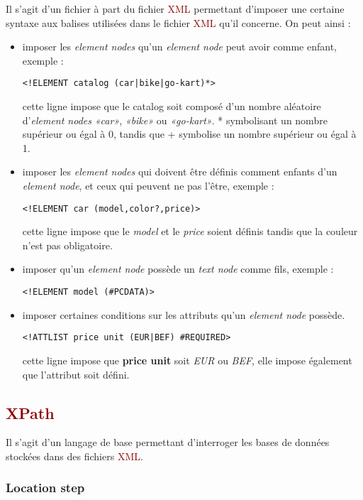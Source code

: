 \documentclass{article}
\newcommand{\red}[1]{\textcolor{darkred}{#1}}
\begin{document}
Il s'agit d'un fichier à part du fichier \red{XML} permettant d'imposer une certaine syntaxe aux balises utilisées dans le fichier \red{XML} qu'il concerne. On peut ainsi :
\begin{itemize}
\item imposer les \textit{element nodes} qu'un \textit{element node} peut avoir comme enfant, exemple : 
\begin{verbatim}
<!ELEMENT catalog (car|bike|go-kart)*>
\end{verbatim}
cette ligne impose que le catalog soit composé d'un nombre aléatoire d'\textit{element nodes} \textit{«car»}, \textit{«bike»} ou \textit{«go-kart»}. * symbolisant un nombre 
supérieur ou égal à 0, tandis que + symbolise un nombre supérieur ou égal à 1.
\item imposer les \textit{element nodes} qui doivent être définis comment enfants d'un \textit{element node}, et ceux qui peuvent ne pas l'être, exemple :
 \begin{verbatim}
<!ELEMENT car (model,color?,price)>
\end{verbatim}
cette ligne impose que le \textit{model} et le \textit{price} soient définis tandis que la couleur n'est pas obligatoire.
\item imposer qu'un \textit{element node} possède un \textit{text node} comme fils, exemple : 
\begin{verbatim}
<!ELEMENT model (#PCDATA)>
\end{verbatim}
\item imposer certaines conditions sur les attributs qu'un \textit{element node} possède.
\begin{verbatim}
<!ATTLIST price unit (EUR|BEF) #REQUIRED>
\end{verbatim}
cette ligne impose que \textbf{price unit} soit \textit{EUR} ou \textit{BEF}, elle impose également que l'attribut soit défini.
\end{itemize}

\subsection{\red{XPath}}

Il s'agit d'un langage de base permettant d'interroger les bases de données stockées dans des fichiers \red{XML}.

\subsubsection{Location step}
\end{document}
